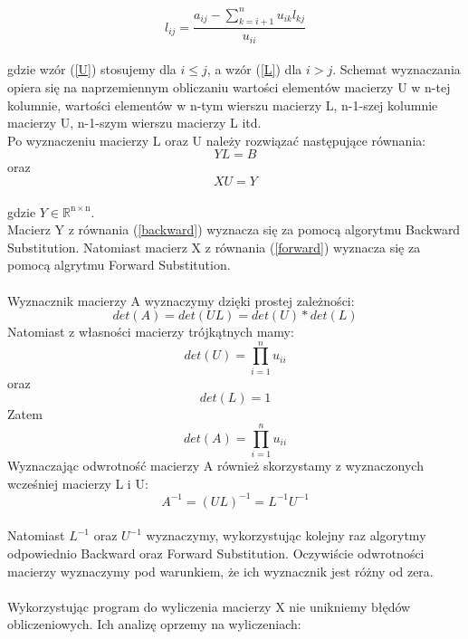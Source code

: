\documentclass[12pt]{article}
\begin{document}
\begin{equation}
l_{ij}=\dfrac{a_{ij}-\sum_{k=i+1}^n u_{ik}l_{kj}}{u_{ii}} \label{L}
\end{equation}
\\
gdzie wz\'or (\ref{U}) stosujemy dla $i \leq j$, a wz\'or (\ref{L}) dla $i > j$.
Schemat wyznaczania opiera si\k{e} na naprzemiennym obliczaniu warto\'sci element\'ow macierzy U w n-tej kolumnie, warto\'sci element\'ow w n-tym wierszu macierzy L, n-1-szej kolumnie macierzy U, n-1-szym wierszu macierzy L itd.
\\
Po wyznaczeniu macierzy L oraz U nale\.zy rozwi\k{a}za\'c nast\k{e}puj\k{a}ce r\'ownania:
\begin{equation}
YL=B \label{backward}
\end{equation}
oraz
\begin{equation}
XU=Y \label{forward}
\end{equation}
\\
gdzie $Y\in \mathbb R^\mathrm{n\times n}$. 
\\
Macierz Y z r\'ownania (\ref{backward}) wyznacza si\k{e} za pomoc\k{a} algorytmu Backward Substitution. Natomiast macierz X z r\'ownania (\ref{forward}) wyznacza si\k{e} za pomoc\k{a} algrytmu Forward Substitution.
\\
\\
Wyznacznik macierzy A wyznaczymy dzi\k{e}ki prostej zale\.zno\'sci:
\[
det(A)=det(UL)=det(U)*det(L)
\]
Natomiast z w\l{}asno\'sci macierzy tr\'ojk\k{a}tnych mamy:
\[
det(U)=\prod_{i=1}^n u_{ii}
\]
oraz
\[
det(L)=1
\]
Zatem 
\[
det(A)=\prod_{i=1}^n u_{ii}
\]
Wyznaczaj\k{a}c odwrotno\'s\'c macierzy A r\'ownie\.z skorzystamy z wyznaczonych wcze\'sniej macierzy L i U:
\[
A^{-1}=(UL)^{-1}=L^{-1}U^{-1}
\]
\\
Natomiast $L^{-1}$ oraz $U^{-1}$ wyznaczymy, wykorzystuj\k{a}c kolejny raz algorytmy odpowiednio Backward oraz Forward Substitution. Oczywi\'scie odwrotno\'sci macierzy wyznaczymy pod warunkiem, \.ze ich wyznacznik jest r\'o\.zny od zera. 
\\
\\
Wykorzystuj\k{a}c program do wyliczenia macierzy X nie unikniemy b\l{}\k{e}d\'ow obliczeniowych. Ich analiz\k{e} oprzemy na wyliczeniach:
\end{document}
